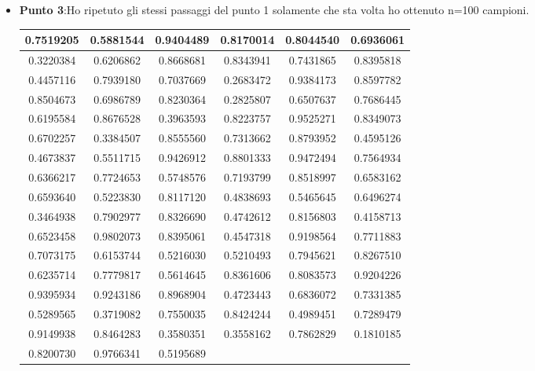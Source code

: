 \documentclass[a4paper,12pt]{article}
\begin{document}
\begin{itemize}
\begin{figure}[h]
	\end{figure}
	\newpage
	\item \textbf{Punto 3}:Ho ripetuto gli stessi passaggi del punto 1 solamente che sta volta ho ottenuto n=100 campioni.\\
	\begin{center}
		\begin{tabular}{|c|c|c|c|c|c|}
			\hline
			0.7519205 & 0.5881544 & 0.9404489 & 0.8170014 & 0.8044540 & 0.6936061 \\
			\hline
			0.3220384 & 0.6206862 & 0.8668681 & 0.8343941 & 0.7431865 & 0.8395818 \\
			\hline
			0.4457116 & 0.7939180 & 0.7037669 & 0.2683472 & 0.9384173 & 0.8597782 \\
			\hline
			0.8504673 & 0.6986789 & 0.8230364 & 0.2825807 & 0.6507637 & 0.7686445 \\
			\hline
			0.6195584 & 0.8676528 & 0.3963593 & 0.8223757 & 0.9525271 & 0.8349073 \\
			\hline
			0.6702257 & 0.3384507 & 0.8555560 & 0.7313662 & 0.8793952 & 0.4595126 \\
			\hline
			0.4673837 & 0.5511715 & 0.9426912 & 0.8801333 & 0.9472494 & 0.7564934 \\
			\hline
			0.6366217 & 0.7724653 & 0.5748576 & 0.7193799 & 0.8518997 & 0.6583162 \\
			\hline
			0.6593640 & 0.5223830 & 0.8117120 & 0.4838693 & 0.5465645 & 0.6496274 \\
			\hline
			0.3464938 & 0.7902977 & 0.8326690 & 0.4742612 & 0.8156803 & 0.4158713 \\
			\hline
			0.6523458 & 0.9802073 & 0.8395061 & 0.4547318 & 0.9198564 & 0.7711883 \\
			\hline
			0.7073175 & 0.6153744 & 0.5216030 & 0.5210493 & 0.7945621 & 0.8267510 \\
			\hline
			0.6235714 & 0.7779817 & 0.5614645 & 0.8361606 & 0.8083573 & 0.9204226 \\
			\hline
			0.9395934 & 0.9243186 & 0.8968904 & 0.4723443 & 0.6836072 & 0.7331385 \\
			\hline
			0.5289565 & 0.3719082 & 0.7550035 & 0.8424244 & 0.4989451 & 0.7289479 \\
			\hline
			0.9149938 & 0.8464283 & 0.3580351 & 0.3558162 & 0.7862829 & 0.1810185 \\
			\hline
			0.8200730 & 0.9766341 & 0.5195689 & & & \\
			\hline
		\end{tabular}
	\end{center}

\end{itemize}
\end{document}
